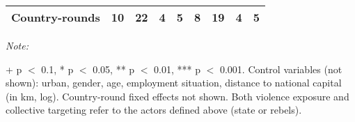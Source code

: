 \begin{table}[!h]
{\begin{threeparttable}
\begin{tabular}[t]{lcccccccc}
Country-rounds & 10 & 22 & 4 & 5 & 8 & 19 & 4 & 5\\
\bottomrule
\end{tabular}
\begin{tablenotes}[para]
\item \textit{Note: } 
\item + p $<$ 0.1, * p $<$ 0.05, ** p $<$ 0.01, *** p $<$ 0.001. Control variables (not shown): urban, gender, age, employment situation, distance to national capital (in km, log). Country-round fixed effects not shown. Both violence exposure and collective targeting refer to the actors defined above (state or rebels).
\end{tablenotes}
\end{threeparttable}}
\end{table}
